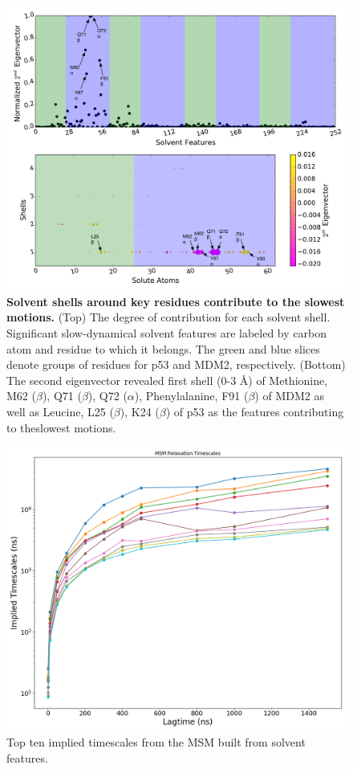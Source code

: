\begin{figure}[h!]
\centering
\includegraphics[scale=0.5]{Figures/SI/Solvent_Shell_Feature_Eigen_2}
\caption{\textbf{Solvent shells around key residues contribute to the slowest motions.} (Top) The degree of contribution for each solvent shell. Significant slow-dynamical solvent features are labeled by carbon atom and residue to which it belongs. The green and blue slices denote groups of residues for p53 and MDM2, respectively. (Bottom)  The second eigenvector revealed first shell (0-3 Å) of Methionine, M62 ($\beta$), Q71 ($\beta$), Q72 ($\alpha$), Phenylalanine, F91 ($\beta$) of MDM2 as well as Leucine, L25 ($\beta$), K24 ($\beta$) of p53 as the features contributing to theslowest motions.}
\label{fig:2nd_eigenvector}
\end{figure}


\begin{figure}[h!]
\centering
\includegraphics[scale=0.5]{Figures/Implied_timescales/solvent_lag_50_clusters_600.png}
\caption{Top ten implied timescales from the MSM built from solvent features.
}
\label{fig:implied_timescales}
\end{figure}




